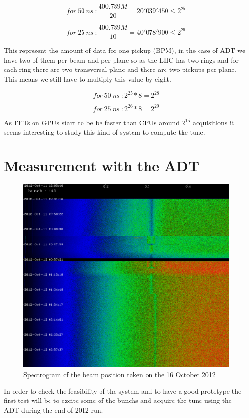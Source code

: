 \documentclass[a4paper]{article}
\begin{document}
$$for~50~ns~: \frac{400.789M}{20} = 20'039'450 \leq 2^{25}$$

$$for~25~ns~: \frac{400.789M}{10} = 40'078'900 \leq 2^{26}$$ 

This represent the amount of data for one pickup (\gls{BPM}), in the case of 
\gls{ADT} we have two of them per beam and per plane so as the \gls{LHC} has 
two rings and for each ring there are two transversal plane and there are 
two pickups per plane. This means we still have to multiply this value by 
eight.

$$for~50~ns~: 2^{25} * 8 = 2^{28}$$

$$for~25~ns~: 2^{26} * 8 = 2^{29}$$

As \glspl{FFT} on \glspl{GPU} start to be be faster than \glspl{CPU} around 
$2^{15}$ acquisitions it seems interesting to study this kind of system to 
compute the \gls{tune}.

\section{Measurement with the ADT}

\begin{figure}[H]
\caption{Spectrogram of the beam position taken on the 16 October 2012}
\centering
\includegraphics[scale=0.2]{spectrogram.pdf}
\end{figure}

In order to check the feasibility of the system and to have a good prototype
the first test will be to excite some of the \glspl{bunch} and acquire the
\gls{tune} using the \gls{ADT} during the end of 2012 run.
\end{document}
